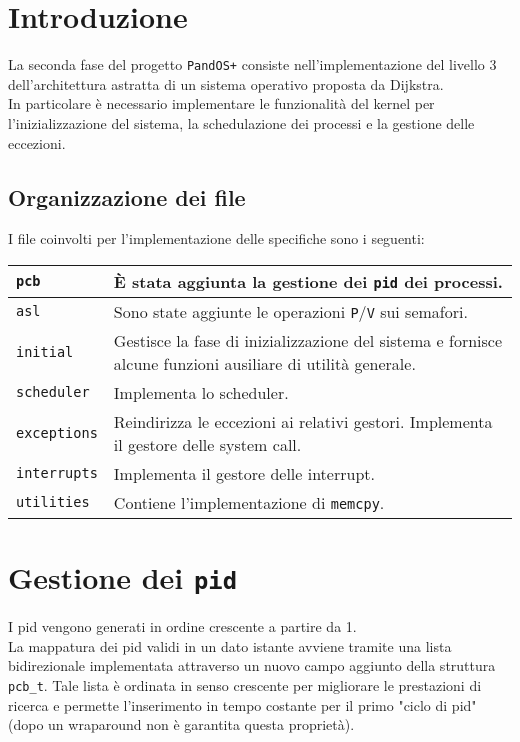 \documentclass[11pt]{article}
\begin{document}
\newpage

\section{Introduzione}
La seconda fase del progetto \texttt{PandOS+} consiste nell'implementazione del livello 3 dell'architettura astratta di un sistema operativo proposta da Dijkstra. \\
In particolare è necessario implementare le funzionalità del kernel per l'inizializzazione del sistema, la schedulazione dei processi e la gestione delle eccezioni.

\subsection{Organizzazione dei file}
I file coinvolti per l'implementazione delle specifiche sono i seguenti:
\begin{center}
    \begin{tabular}{ | m{3cm} | m{10cm} | } 
        \hline
        \texttt{pcb}          & È stata aggiunta la gestione dei \texttt{pid} dei processi. \\ 
        \hline
        \texttt{asl}          & Sono state aggiunte le operazioni \texttt{P}/\texttt{V} sui semafori. \\ 
        \hline
        \texttt{initial}      & Gestisce la fase di inizializzazione del sistema e fornisce alcune funzioni ausiliare di utilità generale. \\ 
        \hline
        \texttt{scheduler}    & Implementa lo scheduler. \\ 
        \hline
        \texttt{exceptions}   & Reindirizza le eccezioni ai relativi gestori. Implementa il gestore delle system call. \\ 
        \hline
        \texttt{interrupts}   & Implementa il gestore delle interrupt. \\ 
        \hline
        \texttt{utilities}    & Contiene l'implementazione di \texttt{memcpy}. \\ 
        \hline
    \end{tabular}
\end{center}

\section{Gestione dei \texttt{pid}}
I pid vengono generati in ordine crescente a partire da 1.\\
La mappatura dei pid validi in un dato istante avviene tramite una lista bidirezionale implementata attraverso un nuovo campo aggiunto della struttura \texttt{pcb\_t}.
Tale lista è ordinata in senso crescente per migliorare le prestazioni di ricerca e permette l'inserimento in tempo costante per il primo "ciclo di pid" (dopo un wraparound non è garantita questa proprietà).
\end{document}
